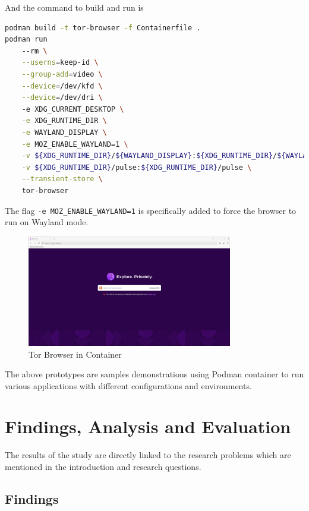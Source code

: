 \documentclass[journal,onecolumn]{IEEEtran}
\newcommand{\code}[1]{\texttt{#1}}
\begin{document}
And the command to build and run is
\begin{lstlisting}[language=Bash]
podman build -t tor-browser -f Containerfile .
podman run
    --rm \
    --userns=keep-id \
    --group-add=video \
    --device=/dev/kfd \
    --device=/dev/dri \ 
    -e XDG_CURRENT_DESKTOP \
    -e XDG_RUNTIME_DIR \
    -e WAYLAND_DISPLAY \
    -e MOZ_ENABLE_WAYLAND=1 \
    -v ${XDG_RUNTIME_DIR}/${WAYLAND_DISPLAY}:${XDG_RUNTIME_DIR}/${WAYLAND_DISPLAY} \
    -v ${XDG_RUNTIME_DIR}/pulse:${XDG_RUNTIME_DIR}/pulse \
    --transient-store \
    tor-browser
\end{lstlisting}

The flag \code{-e MOZ\_ENABLE\_WAYLAND=1} is specifically added to force the browser to run on Wayland mode.

\begin{figure}[ht]
    \centering
    \includegraphics[width=0.8\textwidth]{proto-tor}
    \caption{Tor Browser in Container}
    \label{fig:proto-tor}
\end{figure}
The above prototypes are samples demonstrations using Podman container to run various applications with different configurations and environments.

\newpage
\section{Findings, Analysis and Evaluation}
The results of the study are directly linked to the research problems which are mentioned in the introduction and research questions.

\subsection{Findings}
\end{document}
